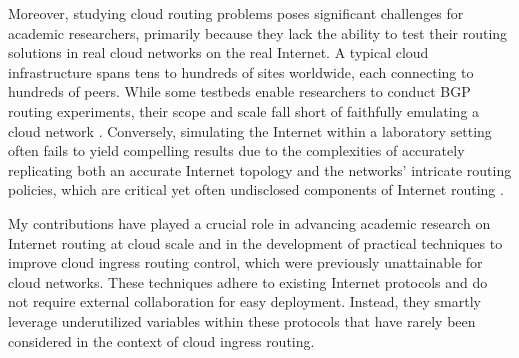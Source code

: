 \documentclass[sigconf,nonacm,screen,letterpaper,9pt]{acmart}
\begin{document}
Moreover, studying cloud routing problems poses significant challenges
for academic researchers, primarily because they lack the ability to
test their routing solutions in real cloud networks on the real
Internet. A typical cloud infrastructure spans tens to hundreds of sites
worldwide, each connecting to hundreds of peers. While some testbeds
enable researchers to conduct BGP routing experiments, their scope and
scale fall short of faithfully emulating a cloud network
\cite{tangled, schlinker19peering}. Conversely, simulating the Internet
within a laboratory setting often fails to yield compelling results due
to the complexities of accurately replicating both an accurate Internet
topology and the networks' intricate routing policies, which are
critical yet often undisclosed components of Internet routing
.

My contributions have played a crucial role in advancing academic
research on Internet routing at cloud scale and in the development of
practical techniques to improve cloud ingress routing control, which
were previously unattainable for cloud networks. These techniques adhere
to existing Internet protocols and do not require external collaboration
for easy deployment. Instead, they smartly leverage underutilized
variables within these protocols that have rarely been considered in the
context of cloud ingress routing.
\end{document}

